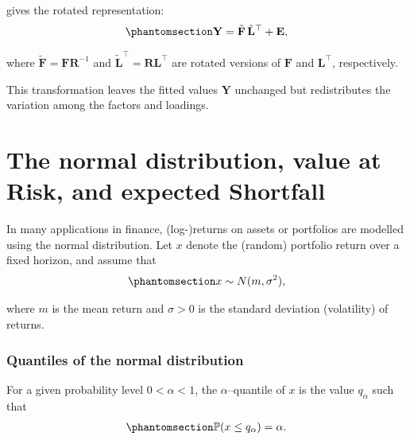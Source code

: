 \documentclass[
  letterpaper,
  DIV=11,
  numbers=noendperiod]{scrreprt}
\begin{document}
gives the rotated representation:
\begin{equation}\protect\phantomsection\label{eq-gen-0066}{  
\begin{align}
    \mathbf{Y} = \tilde{\mathbf{F}}\, \tilde{\mathbf{L}}^{\top} + \mathbf{E},
\end{align}
}\end{equation}

where \(\tilde{\mathbf{F}} = \mathbf{F}\mathbf{R}^{-1}\) and
\(\tilde{\mathbf{L}}^{\top} = \mathbf{R}\mathbf{L}^{\top}\) are rotated
versions of \(\mathbf{F}\) and \(\mathbf{L}^{\top}\), respectively.

This transformation leaves the fitted values \(\mathbf{Y}\) unchanged
but redistributes the variation among the factors and loadings.


\chapter{The normal distribution, value at Risk, and expected
Shortfall}\label{the-normal-distribution-value-at-risk-and-expected-shortfall}

In many applications in finance, (log-)returns on assets or portfolios
are modelled using the normal distribution. Let \(x\) denote the
(random) portfolio return over a fixed horizon, and assume that
\begin{equation}\protect\phantomsection\label{eq-gen-0067}{  
\begin{align}
    x \sim N(m,\sigma^{2}),
\end{align}
}\end{equation}

where \(m\) is the mean return and \(\sigma>0\) is the standard
deviation (volatility) of returns.

\subsection*{Quantiles of the normal
distribution}\label{quantiles-of-the-normal-distribution}

For a given probability level \(0<\alpha<1\), the \(\alpha\)--quantile
of \(x\) is the value \(q_{\alpha}\) such that
\begin{equation}\protect\phantomsection\label{eq-gen-0068}{  
\begin{align}
    \mathbb{P}(x \leq q_{\alpha}) = \alpha.
\end{align}
}\end{equation}
\end{document}
